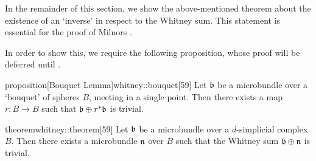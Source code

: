\begin{myparagraph}
    In the remainder of this section, we show the above-mentioned theorem about the
    existence of an `inverse' in respect to the Whitney sum.
    This statement is essential for the proof of Milnors .

    In order to show this, we require the following proposition,
    whose proof will be deferred until .

\end{myparagraph}

\begin{mystatement}{proposition}[Bouquet Lemma]{whitney::bouquet}[59]
    Let $\bb$ be a microbundle over a `bouquet' of spheres $B$, meeting in a single point.
    Then there exists a map $r: B \to B$ such that $\whitney{\bb}{\ind{r}\bb}$ is trivial.
\end{mystatement}

\begin{mystatement}{theorem}{whitney::theorem}[59]
    Let $\bb$ be a microbundle over a $d$-simplicial complex $B$.
    Then there exists a microbundle $\mathfrak{n}$ over $B$ such that
    the Whitney sum $\whitney{\bb}{\bn}$ is trivial.
\end{mystatement}

